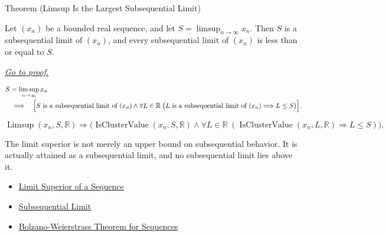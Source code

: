 
\begin{theorembox}{Theorem (Limsup Is the Largest Subsequential Limit)}
\begin{theorem}
\label{thm:limsup-largest-subsequential-limit}
Let $(x_n)$ be a bounded real sequence, and let
$S=\limsup_{n\to\infty}x_n$. Then $S$ is a subsequential limit of
$(x_n)$, and every subsequential limit of $(x_n)$ is less than or equal
to $S$.

\smallskip
\noindent
\hyperref[prf:limsup-largest-subsequential-limit]{\textit{Go to proof.}}
\end{theorem}
\end{theorembox}

\begin{remark*}
\[
\begin{aligned}
&S=\limsup_{n\to\infty}x_n\\
&\quad\Longrightarrow\quad
\Bigl[
  S\text{ is a subsequential limit of }(x_n)
  \land
  \forall L\in\mathbb{R}\;
  \bigl(L\text{ is a subsequential limit of }(x_n)\Longrightarrow L\le S\bigr)
\Bigr].
\end{aligned}
\]
\end{remark*}

\begin{remark*}
\[
\operatorname{Limsup}(x_n,S,\mathbb{R})
\Longrightarrow
\bigl(
  \operatorname{IsClusterValue}(x_n,S,\mathbb{R})
  \land
  \forall L\in\mathbb{R}\;
  (\operatorname{IsClusterValue}(x_n,L,\mathbb{R})\Longrightarrow L\le S)
\bigr).
\]
\end{remark*}

\begin{remark*}[Interpretation]
The limit superior is not merely an upper bound on subsequential behavior. It
is actually attained as a subsequential limit, and no subsequential limit lies
above it.
\end{remark*}

\begin{dependencies}
\begin{itemize}
  \item \hyperref[def:limsup-sequence]{Limit Superior of a Sequence}
  \item \hyperref[def:subsequential-limit]{Subsequential Limit}
  \item \hyperref[thm:bolzano-weierstrass-sequences]{Bolzano-Weierstrass Theorem for Sequences}
\end{itemize}
\end{dependencies}

